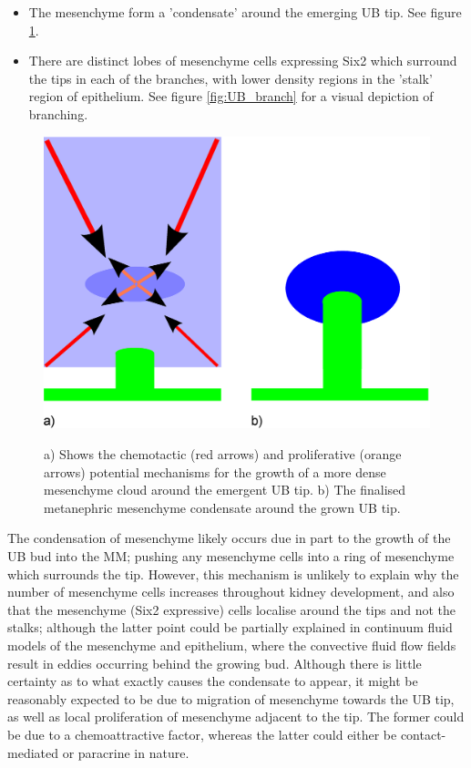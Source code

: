 \documentclass[pdftex,10pt,a4paper]{article}
\begin{document}
\begin{itemize}
\item The mesenchyme form a 'condensate' around the emerging UB tip. See figure \ref{fig:condensation}.
\item There are distinct lobes of mesenchyme cells expressing Six2 which surround the tips in each of the branches, with lower density regions in the 'stalk' region of epithelium. See figure \ref{fig:UB_branch} for a visual depiction of branching.
\end{itemize}

\begin{figure}[t] 
\centering
\scalebox{0.35} 
{\includegraphics{condensation.eps}}
\caption{a) Shows the chemotactic (red arrows) and proliferative (orange arrows) potential mechanisms for the growth of a more dense mesenchyme cloud around the emergent UB tip. b) The finalised metanephric mesenchyme condensate around the grown UB tip.}\label{fig:condensation}
\end{figure} 

The condensation of mesenchyme likely occurs due in part to the growth of the UB bud into the MM; pushing any mesenchyme cells into a ring of mesenchyme which surrounds the tip. However, this mechanism is unlikely to explain why the number of mesenchyme cells increases throughout kidney development, and also that the mesenchyme (Six2 expressive) cells localise around the tips and not the stalks; although the latter point could be partially explained in continuum fluid models of the mesenchyme and epithelium, where the convective fluid flow fields result in eddies occurring behind the growing bud. Although there is little certainty as to what exactly causes the condensate to appear, it might be reasonably expected to be due to migration of mesenchyme towards the UB tip, as well as local proliferation of mesenchyme adjacent to the tip. The former could be due to a chemoattractive factor, whereas the latter could either be contact-mediated or paracrine in nature.
\end{document}
